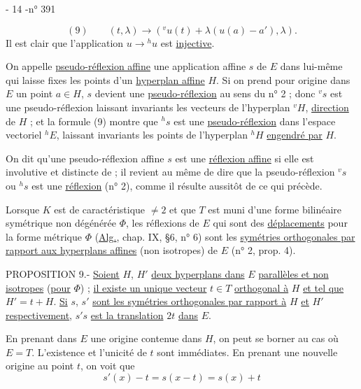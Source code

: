 
- 14 -\hfill n° 391

\[
(9)\qquad(t,\lambda)\longrightarrow({}^vu(t)+\lambda(u(a)-a'),\lambda).
\]
Il est clair que l'application $u\longrightarrow{}^hu$ est \uline{injective}.

On appelle \uline{pseudo-réflexion affine} une application affine $s$ de $E$ dans lui-même qui laisse fixes les points d'un \uline{hyperplan affine} $H$. Si on prend pour origine dans $E$ un point $a\in H$, $s$ devient une \uline{pseudo-réflexion} au sens du n° 2 ; donc ${}^vs$ est une pseudo-réflexion laissant invariants les vecteurs de l'hyperplan ${}^vH$, \uline{direction} de $H$ ; et la formule (9) montre que ${}^hs$ est une \uline{pseudo-réflexion} dans l'espace vectoriel ${}^hE$, laissant invariants les points de l'hyperplan ${}^hH$ \uline{engendré par} $H$.

On dit qu'une pseudo-réflexion affine $s$ est une \uline{réflexion affine} si elle est involutive et distincte de  ; il revient au même de dire que la pseudo-réflexion ${}^vs$ ou ${}^hs$ est une \uline{réflexion} (n° 2), comme il résulte aussitôt de ce qui précède.

Lorsque $K$ est de caractéristique $\ne2$ et que $T$ est muni d'une forme bilinéaire symétrique non dégénérée $\Phi$, les réflexions de $E$ qui sont des \uline{déplacements} pour la forme métrique $\Phi$ (\uline{Alg.}, chap. IX, §6, n° 6) sont les \uline{symétries orthogonales par rapport aux hyperplans affines} (non isotropes) de $E$ (n° 2, prop. 4).

PROPOSITION 9.- \uline{Soient} $H$, $H'$ \uline{deux hyperplans dans} $E$ \uline{parallèles et non isotropes} (\uline{pour} $\Phi$) ; \uline{il existe un unique vecteur} $t\in T$ \uline{orthogonal à} $H$ \uline{et tel que} $H'=t+H$. \uline{Si} $s$, $s'$ \uline{sont les symétries orthogonales par rapport à} $H$ \uline{et} $H'$ \uline{respectivement}, $s's$ \uline{est la translation} $2t$ \uline{dans} $E$.

En prenant dans $E$ une origine contenue dans $H$, on peut se borner au cas où $E=T$. L'existence et l'unicité de $t$ sont immédiates. En prenant une nouvelle origine au point $t$, on voit que
\[
s'(x)-t=s(x-t)=s(x)+t
\]
